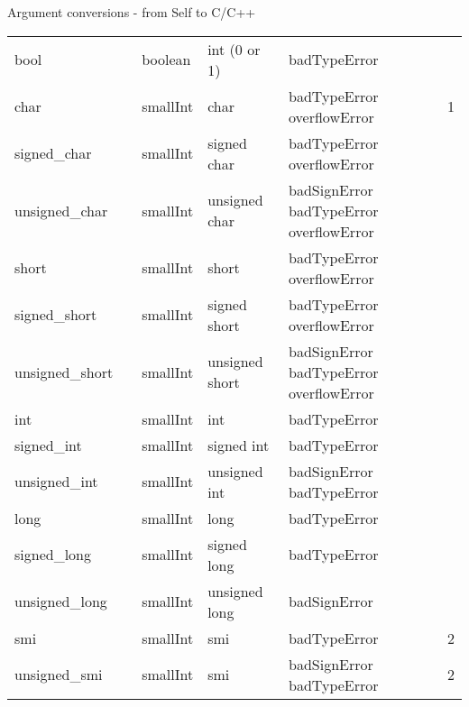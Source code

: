 \documentclass[letterpaper,10pt,english]{sphinxmanual}
\begin{document}
\begin{threeparttable}
\capstart\caption{Argument conversions - from Self to C/C++}\label{\detokenize{vmref:tableargumentconversions}}\label{\detokenize{vmref:id12}}
\noindent\begin{tabulary}{\linewidth}{p{2cm} p{2cm} p{2cm} p{2cm} p{3cm} p{2cm}}
\hline
{}\relax &\relax &\relax &\relax &\relax &\relax \\
\hline
bool
&&
boolean
&
int (0 or 1)
&
badTypeError
&\\
\hline
char
&&
smallInt
&
char
&
badTypeError overflowError
&
1
\\
\hline
signed\_char
&&
smallInt
&
signed char
&
badTypeError overflowError
&\\
\hline
unsigned\_char
&&
smallInt
&
unsigned char
&
badSignError badTypeError overflowError
&\\
\hline
short
&&
smallInt
&
short
&
badTypeError overflowError
&\\
\hline
signed\_short
&&
smallInt
&
signed short
&
badTypeError overflowError
&\\
\hline
unsigned\_short
&&
smallInt
&
unsigned short
&
badSignError badTypeError overflowError
&\\
\hline
int
&&
smallInt
&
int
&
badTypeError
&\\
\hline
signed\_int
&&
smallInt
&
signed int
&
badTypeError
&\\
\hline
unsigned\_int
&&
smallInt
&
unsigned int
&
badSignError badTypeError
&\\
\hline
long
&&
smallInt
&
long
&
badTypeError
&\\
\hline
signed\_long
&&
smallInt
&
signed long
&
badTypeError
&\\
\hline
unsigned\_long
&&
smallInt
&
unsigned long
&
badSignError
&\\
\hline
smi
&&
smallInt
&
smi
&
badTypeError
&
2
\\
\hline
unsigned\_smi
&&
smallInt
&
smi
&
badSignError badTypeError
&
2
\\
\hline\end{tabulary}

\end{threeparttable}
\end{document}
